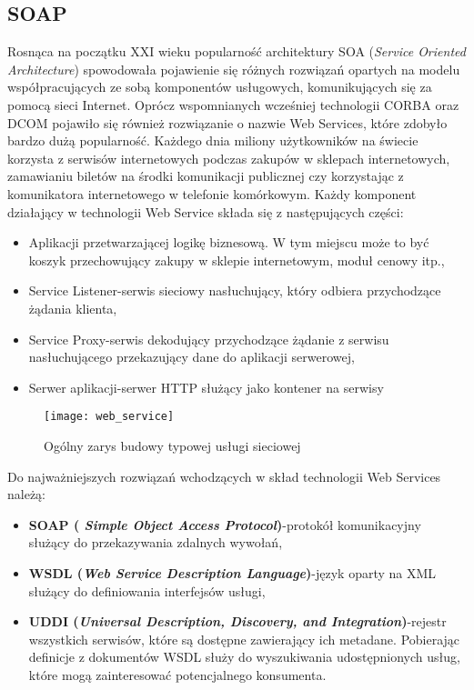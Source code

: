 \subsection{SOAP}
Rosnąca na początku XXI wieku popularność architektury SOA (\textit{Service Oriented Architecture}) spowodowała pojawienie się różnych rozwiązań opartych na modelu współpracujących ze sobą komponentów usługowych, komunikujących się za pomocą sieci Internet. Oprócz wspomnianych wcześniej technologii CORBA oraz DCOM pojawiło się również rozwiązanie o nazwie Web Services, które zdobyło bardzo dużą popularność. Każdego dnia miliony użytkowników na świecie korzysta z serwisów internetowych podczas zakupów w sklepach internetowych, zamawianiu biletów na środki komunikacji publicznej czy korzystając z komunikatora internetowego w telefonie komórkowym. Każdy komponent działający w technologii Web Service składa się z następujących części\cite{snell2002programming}:
\begin{itemize}
	\item Aplikacji przetwarzającej logikę biznesową. W tym miejscu może to być koszyk przechowujący zakupy w sklepie internetowym, moduł cenowy itp.,
	\item Service Listener-serwis sieciowy nasłuchujący, który odbiera przychodzące żądania klienta,
	\item  Service Proxy-serwis dekodujący przychodzące żądanie z serwisu nasłuchującego przekazujący dane do aplikacji serwerowej,
	\item Serwer aplikacji-serwer HTTP służący jako kontener na serwisy
\end{itemize}
\begin{figure}[ht]
	\caption{Ogólny zarys budowy typowej usługi sieciowej}
	\texttt{[image: web\_service]}
	\centering
\end{figure}
\newpage
\noindent
Do najważniejszych rozwiązań wchodzących w skład technologii Web Services należą:
\begin{itemize}
	\item \textbf{SOAP (\textit{ Simple Object Access Protocol})}-protokół komunikacyjny służący do przekazywania zdalnych wywołań,
	\item \textbf{WSDL (\textit{Web Service Description Language})}-język oparty na XML służący do definiowania interfejsów usługi,
	\item \textbf{UDDI (\textit{Universal Description, Discovery, and Integration})}-rejestr wszystkich serwisów, które są dostępne zawierający ich metadane. Pobierając definicje z dokumentów WSDL służy do wyszukiwania udostępnionych usług, które mogą zainteresować potencjalnego konsumenta.
\end{itemize}
